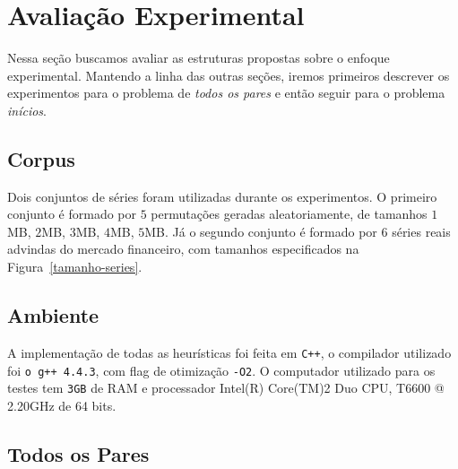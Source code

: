 \documentclass[12pt]{article}
\begin{document}
\section{Avaliação Experimental}

Nessa seção buscamos avaliar as estruturas propostas sobre o enfoque experimental.
 Mantendo a linha das outras seções, iremos primeiros descrever os experimentos para o problema de \textit{todos os pares}
e então seguir para o problema \textit{inícios}.

\subsection{Corpus}

Dois conjuntos de séries foram utilizadas durante os experimentos. 
O primeiro conjunto é formado por $5$ permutações geradas aleatoriamente, de tamanhos $1$MB, $2$MB, $3$MB, $4$MB, $5$MB.
Já o segundo conjunto é formado por $6$ séries reais advindas do mercado financeiro,
 com tamanhos especificados na Figura~\ref{tamanho-series}.


\subsection{Ambiente}

A implementação de todas as heurísticas foi feita em \verb|C++|, o compilador
utilizado foi \verb|o g++ 4.4.3|, com flag de otimização \verb|-O2|. O computador
utilizado para os testes tem \verb|3GB| de RAM e processador Intel(R) Core(TM)2 Duo CPU, T6600  @ 2.20GHz
de 64 bits.


\subsection{Todos os Pares}
\end{document}
